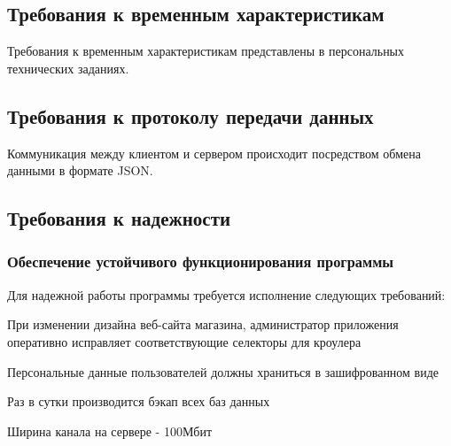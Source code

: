 \subsection{Требования к временным характеристикам}

Требования к временным характеристикам представлены в персональных технических заданиях.


\subsection{Требования к протоколу передачи данных}

Коммуникация между клиентом и сервером происходит посредством обмена данными в формате JSON.

\subsection{Требования к надежности}
\subsubsection{Обеспечение устойчивого функционирования программы}

Для надежной работы программы требуется исполнение следующих требований:
\begin{my_enumerate}
\item При изменении дизайна веб-сайта магазина, администратор приложения оперативно
исправляет соответствующие селекторы для кроулера
\item Персональные данные пользователей должны храниться в зашифрованном виде
\item Раз в сутки производится бэкап всех баз данных
\item Ширина канала на сервере - 100Мбит
\end{my_enumerate}


